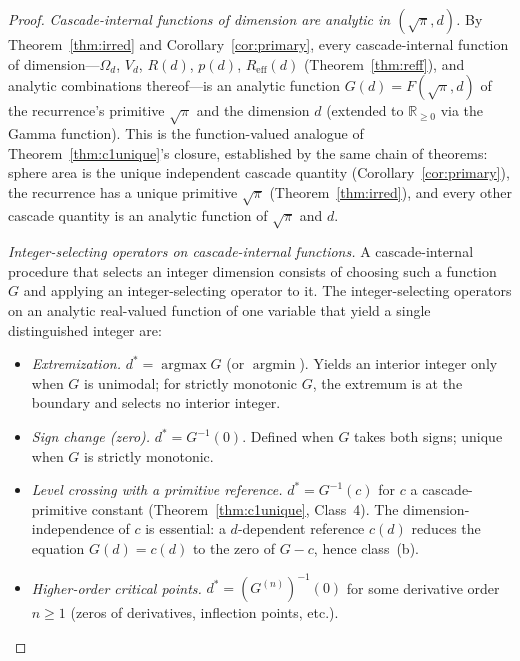 \documentclass[11pt,a4paper]{article}
\begin{document}
\begin{proof}
\emph{Cascade-internal functions of dimension are analytic in
$(\sqrt{\pi}, d)$.} By Theorem~\ref{thm:irred} and
Corollary~\ref{cor:primary}, every cascade-internal function of
dimension---$\Omega_d$, $V_d$, $R(d)$, $p(d)$, $R_{\mathrm{eff}}(d)$
(Theorem~\ref{thm:reff}), and analytic combinations thereof---is an
analytic function $G(d) = F(\sqrt{\pi}, d)$ of the recurrence's
primitive $\sqrt{\pi}$ and the dimension $d$ (extended to
$\mathbb{R}_{\geq 0}$ via the Gamma function). This is the
function-valued analogue of Theorem~\ref{thm:c1unique}'s closure,
established by the same chain of theorems: sphere area is the unique
independent cascade quantity (Corollary~\ref{cor:primary}), the
recurrence has a unique primitive $\sqrt{\pi}$
(Theorem~\ref{thm:irred}), and every other cascade quantity is an
analytic function of $\sqrt{\pi}$ and $d$.

\emph{Integer-selecting operators on cascade-internal functions.} A
cascade-internal procedure that selects an integer dimension consists
of choosing such a function $G$ and applying an integer-selecting
operator to it. The integer-selecting operators on an analytic
real-valued function of one variable that yield a single distinguished
integer are:
\begin{itemize}
\item[(a)] \emph{Extremization.} $d^* = \operatorname{argmax} G$ (or
$\operatorname{argmin}$). Yields an interior integer only when $G$ is
unimodal; for strictly monotonic $G$, the extremum is at the boundary
and selects no interior integer.
\item[(b)] \emph{Sign change (zero).} $d^* = G^{-1}(0)$. Defined when
$G$ takes both signs; unique when $G$ is strictly monotonic.
\item[(c)] \emph{Level crossing with a primitive reference.}
$d^* = G^{-1}(c)$ for $c$ a cascade-primitive constant
(Theorem~\ref{thm:c1unique}, Class~4). The dimension-independence of
$c$ is essential: a $d$-dependent reference $c(d)$ reduces the equation
$G(d) = c(d)$ to the zero of $G - c$, hence class~(b).
\item[(d)] \emph{Higher-order critical points.} $d^* = (G^{(n)})^{-1}(0)$
for some derivative order $n \geq 1$ (zeros of derivatives, inflection
points, etc.).
\end{itemize}


\end{proof}
\end{document}
